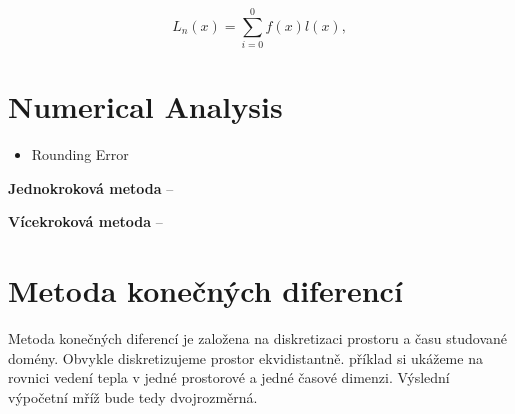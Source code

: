 \begin{equation}
    L_n(x) = \sum_{i=0}^0 f(x) l(x),
\end{equation}


\section{Numerical Analysis}
\begin{itemize}
    \item Rounding Error
\end{itemize}

\textbf{Jednokroková metoda} --

\textbf{Vícekroková metoda} --


\section{Metoda konečných diferencí}

Metoda konečných diferencí je založena na diskretizaci prostoru a času studované domény. Obvykle diskretizujeme prostor ekvidistantně. příklad si ukážeme na rovnici vedení tepla  v jedné prostorové a jedné časové dimenzi. Výslední výpočetní mříž bude tedy dvojrozměrná.